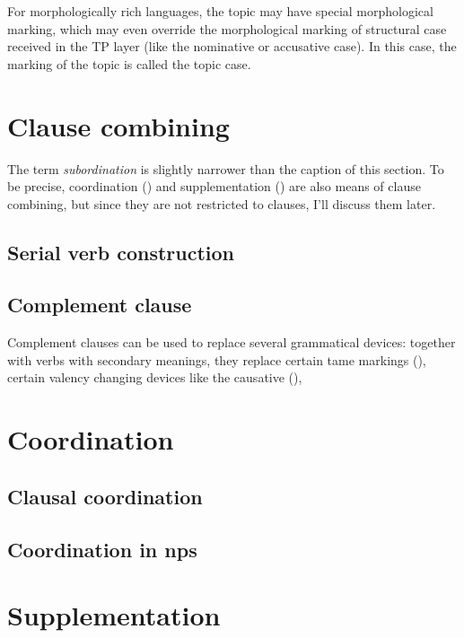 \documentclass[UTF8, a4paper, oneside, scheme=plain]{ctexart}
\newcommand*{\term}[1]{\emph{#1}}
\begin{document}
For morphologically rich languages,
the topic may have special morphological marking,
which may even override the morphological marking of structural case received in the TP layer 
(like the nominative or accusative case).
In this case,
the marking of the topic is called the topic case.

\section{Clause combining}

The term \term{subordination} is slightly narrower than the caption of this section.
To be precise,
coordination () and supplementation () 
are also means of clause combining,
but since they are not restricted to clauses,
I'll discuss them later.

\subsection{Serial verb construction}

\subsection{Complement clause}\label{sec:complement-clause}

Complement clauses can be used to replace several grammatical devices:
together with verbs with secondary meanings, 
they replace certain \ac{tame} markings (),
certain valency changing devices like the causative (),


\section{Coordination}\label{sec:coord}

\subsection{Clausal coordination}\label{sec:clause-coord}

\subsection{Coordination in \ac{np}s}

\section{Supplementation}\label{sec:clause-supp}



\end{document}

